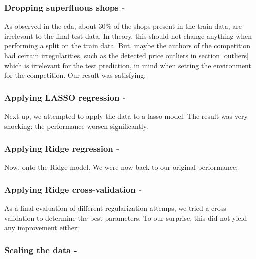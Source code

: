 \subsubsection{Dropping superfluous shops - }

As observed in the \Acrshort{eda}, about 30\% of the shops present in the train data, are irrelevant to the final test data. In theory, this should not change anything when performing a split on the train data. But, maybe the authors of the competition had certain irregularities, such as the detected price outliers in section \ref{outliers} which is irrelevant for the test prediction, in mind when setting the environment for the competition. Our result was satisfying:

\subsubsection{Applying LASSO regression - }

Next up, we attempted to apply the data to a \acrshort{lasso} model. The result was very shocking: the performance worsen significantly.

\subsubsection{Applying Ridge regression - }

Now, onto the Ridge model. We were now back to our original performance:


\subsubsection{Applying Ridge cross-validation - }

As a final evaluation of different regularization attemps, we tried a cross-validation to determine the best parameters. To our surprise, this did not yield any improvement either:

\subsubsection{Scaling the data - }

